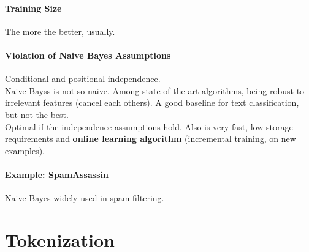 \documentclass[10pt]{report}
\begin{document}
\paragraph{Training Size} The more the better, usually.
\paragraph{Violation of Naive Bayes Assumptions} Conditional and positional independence.\\
Naive Bayss is not so naive. Among state of the art algorithms, being robust to irrelevant features (cancel each others). A good baseline for text classification, but not the best.\\
Optimal if the independence assumptions hold. Also is very fast, low storage requirements and \textbf{online learning algorithm} (incremental training, on new examples).
\paragraph{Example: SpamAssassin} Naive Bayes widely used in spam filtering.
\section{Tokenization}
\end{document}

